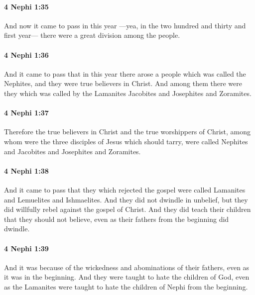 		\paragraph{4 Nephi 1:35} %
			\label{4NEPHI-1-35}

			And now it came to pass in this year
			—yea, in the two hundred and thirty and first year—
			there were a great division among the people.

		\paragraph{4 Nephi 1:36} %
			\label{4NEPHI-1-36}

			And it came to pass that in this year
			there arose a people which was called the Nephites,
			and they were true believers in Christ.
			And among them there were they which was called by the Lamanites
			Jacobites and Josephites and Zoramites.

		\paragraph{4 Nephi 1:37} %
			\label{4NEPHI-1-37}

			Therefore the true believers in Christ and the true worshippers of Christ,
			among whom were the three disciples of Jesus which should tarry,
			were called Nephites and Jacobites and Josephites and Zoramites.

		\paragraph{4 Nephi 1:38} %
			\label{4NEPHI-1-38}

			And it came to pass that they which rejected the gospel
			were called Lamanites and Lemuelites and Ishmaelites.
			And they did not dwindle in unbelief,
			but they did willfully rebel against the gospel of Christ.
			And they did teach their children that they should not believe,
			even as their fathers from the beginning did dwindle.

		\paragraph{4 Nephi 1:39} %
			\label{4NEPHI-1-39}

			And it was because of the wickedness and abominations of their fathers,
			even as it was in the beginning.
			And they were taught to hate the children of God,
			even as the Lamanites were taught
			to hate the children of Nephi from the beginning.

